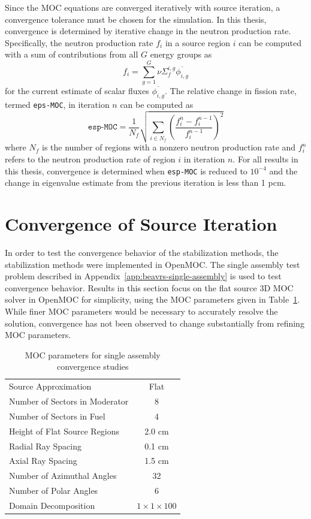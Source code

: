 Since the \ac{MOC} equations are converged iteratively with source iteration, a convergence tolerance must be chosen for the simulation. In this thesis, convergence is determined by iterative change in the neutron production rate. Specifically, the neutron production rate $f_i$ in a source region $i$ can be computed with a sum of contributions from all $G$ energy groups as
\begin{equation}
f_i = \sum_{g=1}^G \nu \Sigma_f^{i,g} \overline{\phi_{i,g}}
\end{equation}
for the current estimate of scalar fluxes $\overline{\phi_{i,g}}$. The relative change in fission rate, termed \texttt{eps-MOC}, in iteration $n$ can be computed as
\begin{equation}
\texttt{esp-MOC} = \frac{1}{N_f} \sqrt{\sum_{i \in N_f} \left(\frac{f_i^n - f_i^{n-1}}{f_i^{n-1}}\right)^2}
\label{eq:eps-MOC}
\end{equation}
where $N_f$ is the number of regions with a nonzero neutron production rate and $f_i^n$ refers to the neutron production rate of region $i$ in iteration $n$. For all results in this thesis, convergence is determined when \texttt{esp-MOC} is reduced to $10^{-4}$ and the change in eigenvalue estimate from the previous iteration is less than 1 pcm. 

\section{Convergence of Source Iteration}
\label{sec:si-convergence}

In order to test the convergence behavior of the stabilization methods, the stabilization methods were implemented in OpenMOC. The single assembly test problem described in Appendix~\ref{app:beavrs-single-assembly} is used to test convergence behavior. Results in this section focus on the flat source 3D \ac{MOC} solver in OpenMOC for simplicity, using the \ac{MOC} parameters given in Table~\ref{tab:convergence-tests-params}. While finer \ac{MOC} parameters would be necessary to accurately resolve the solution, convergence has not been observed to change substantially from refining \ac{MOC} parameters.

\begin{table}[ht]
	\centering
	\caption{MOC parameters for single assembly convergence studies}
	\medskip
	\begin{tabular}{lc}
		\hline
		Source Approximation & Flat \\
		Number of Sectors in Moderator & 8 \\
		Number of Sectors in Fuel & 4 \\
		Height of Flat Source Regions & 2.0 cm \\
		Radial Ray Spacing & 0.1 cm \\
		Axial Ray Spacing & 1.5 cm \\
		Number of Azimuthal Angles & 32 \\
		Number of Polar Angles & 6 \\
		Domain Decomposition & $1 \times 1 \times 100$ \\
		\hline
	\end{tabular}
	\label{tab:convergence-tests-params}
\end{table}

